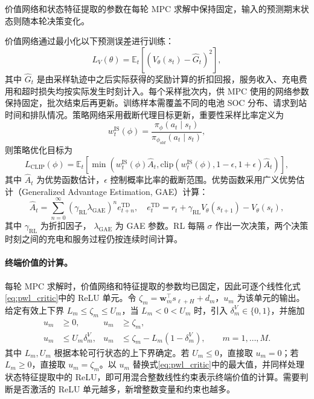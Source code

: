 \documentclass[12pt,a4paper,UTF8]{ctexart}
\begin{document}
价值网络和状态特征提取的参数在每轮 MPC 求解中保持固定，输入的预测期末状态则随本轮决策变化。

价值网络通过最小化以下预测误差进行训练：
\begin{equation}
L_V(\theta)=
\mathbb{E}_t\left[
\left(V_{\theta}(s_t)-\hat{G}_t\right)^2
\right],
\label{eq:value_loss}
\end{equation}
其中 $\hat{G}_t$ 是由采样轨迹中之后实际获得的奖励计算的折扣回报，服务收入、充电费用和超时损失均按实际发生时刻计入。每个采样批次内，供 MPC 使用的网络参数保持固定，批次结束后再更新。训练样本需覆盖不同的电池 SOC 分布、请求到站时间和排队情况。策略网络采用截断代理目标更新，重要性采样比率定义为
\begin{equation}
w_t^{\mathrm{IS}}(\phi)=
\frac{\pi_{\phi}(a_t\mid s_t)}{\pi_{\phi_{old}}(a_t\mid s_t)},
\label{eq:ppo_ratio}
\end{equation}
则策略优化目标为
\begin{equation}
L_{\mathrm{CLIP}}(\phi)=
\mathbb{E}_t\left[
\min\left(
w_t^{\mathrm{IS}}(\phi)\hat{A}_t,
\mathrm{clip}(w_t^{\mathrm{IS}}(\phi),1-\epsilon,1+\epsilon)\hat{A}_t
\right)
\right],
\label{eq:ppo_clip}
\end{equation}
其中 $\hat{A}_t$ 为优势函数估计，$\epsilon$ 控制概率比率的截断范围。优势函数采用广义优势估计（Generalized Advantage Estimation, GAE）计算：
\begin{equation}
\hat{A}_t=\sum_{n=0}^{\infty}
(\gamma_{\mathrm{RL}}\lambda_{\mathrm{GAE}})^n
e_{t+n}^{\mathrm{TD}},
\quad
e_t^{\mathrm{TD}}=r_t
+\gamma_{\mathrm{RL}}V_{\theta}(s_{t+1})-V_{\theta}(s_t),
\label{eq:gae}
\end{equation}
其中 $\gamma_{\mathrm{RL}}$ 为折扣因子，
$\lambda_{\mathrm{GAE}}$ 为 GAE 参数。RL 每隔 $\sigma$ 作出一次决策，两个决策时刻之间的充电和服务过程仍按连续时间计算。

\paragraph{终端价值的计算。}每轮 MPC 求解时，价值网络和特征提取的参数均已固定，因此可逐个线性化式\eqref{eq:pwl_critic}中的 ReLU 单元。令 $\zeta_m=\boldsymbol w_m^\top s_{\ell+H}+d_m$，$u_m$ 为该单元的输出。给定有效上下界 $L_m\le\zeta_m\le U_m$，当 $L_m<0<U_m$ 时，引入 $\delta_m^V\in\{0,1\}$，并施加
\begin{subequations}
\label{eq:pwl_critic_embedding}
\begin{align}
u_m&\ge0,& u_m&\ge\zeta_m,\\
u_m&\le U_m\delta_m^V,&
u_m&\le\zeta_m-L_m(1-\delta_m^V),
\qquad m=1,\ldots,M.
\end{align}
\end{subequations}
其中 $L_m,U_m$ 根据本轮可行状态的上下界确定。若 $U_m\le0$，直接取 $u_m=0$；若 $L_m\ge0$，直接取 $u_m=\zeta_m$。以 $u_m$ 替换式\eqref{eq:pwl_critic}中的最大值，并同样处理状态特征提取中的 ReLU，即可用混合整数线性约束表示终端价值的计算。需要判断是否激活的 ReLU 单元越多，新增整数变量和约束也越多。
\end{document}
